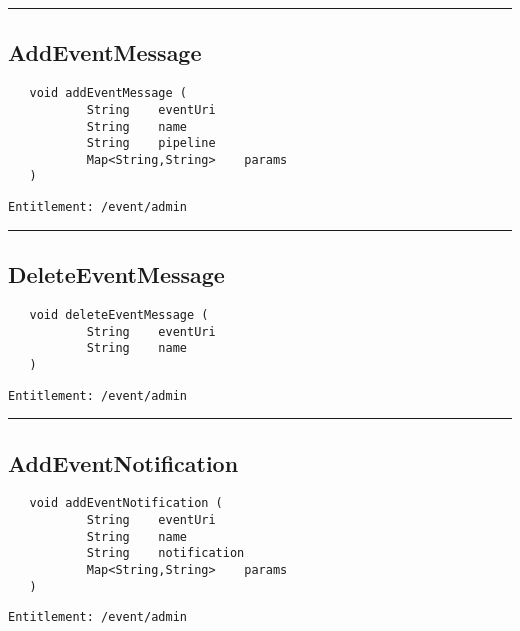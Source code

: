 \rule{12cm}{2pt}
\subsection{AddEventMessage}
\label{Api:AddEventMessage}
\begin{verbatim}
   void addEventMessage (
           String    eventUri
           String    name
           String    pipeline
           Map<String,String>    params
   )
\end{verbatim}
\begin{Verbatim}[fontsize=\small, formatcom=\color{Maroon}]
  Entitlement: /event/admin
\end{Verbatim}



\rule{12cm}{2pt}
\subsection{DeleteEventMessage}
\label{Api:DeleteEventMessage}
\begin{verbatim}
   void deleteEventMessage (
           String    eventUri
           String    name
   )
\end{verbatim}
\begin{Verbatim}[fontsize=\small, formatcom=\color{Maroon}]
  Entitlement: /event/admin
\end{Verbatim}



\rule{12cm}{2pt}
\subsection{AddEventNotification}
\label{Api:AddEventNotification}
\begin{verbatim}
   void addEventNotification (
           String    eventUri
           String    name
           String    notification
           Map<String,String>    params
   )
\end{verbatim}
\begin{Verbatim}[fontsize=\small, formatcom=\color{Maroon}]
  Entitlement: /event/admin
\end{Verbatim}



